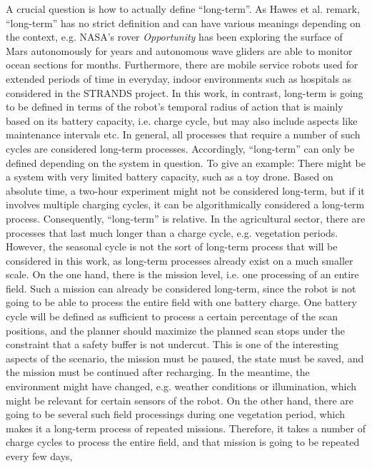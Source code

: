 \documentclass[german, master, expose, latin1]{base/thesis_KBS}
\begin{document}
A crucial question is how to actually define ``long-term''. As Hawes et al. remark, ``long-term'' has no strict definition and can have various meanings depending
on the context, e.g. NASA's rover \textit{Opportunity} has been exploring the surface of Mars autonomously for years and autonomous wave gliders are able to monitor
ocean sections for months. \cite{Hawes:2017} Furthermore, there are mobile service robots used for extended periods of time in everyday, indoor environments such as hospitals 
as considered in the STRANDS project.
In this work, in contrast, long-term is going to be defined in terms of the robot's temporal radius of action that is mainly based on its battery capacity, i.e. charge cycle,
but may also include aspects like maintenance intervals etc. In general, all processes that require a number of such cycles are considered long-term processes.
Accordingly, ``long-term'' can only be defined depending on the system in question. To give an example: There might be a system with very limited battery capacity, 
such as a toy drone. Based on absolute time, a two-hour experiment might not be considered long-term, but if it involves multiple charging cycles, it can be 
algorithmically considered a long-term process. Consequently, ``long-term'' is relative.\newline
In the agricultural sector, there are processes that last much longer than a charge cycle, e.g. vegetation periods.
However, the seasonal cycle is not the sort of long-term process that will be considered in this work, as long-term processes already exist on a much smaller scale.
On the one hand, there is the mission level, i.e. one processing of an entire field. Such a mission can already be considered long-term, since the robot is not 
going to be able to process the entire field with one battery charge. One battery cycle will be defined as sufficient to process a certain percentage of the scan
positions, and the planner should maximize the planned scan stops under the constraint that a safety buffer is not undercut.
This is one of the interesting aspects of the scenario, the mission must be paused, the state must be saved, and the mission must be continued after recharging.
In the meantime, the environment might have changed, e.g. weather conditions or illumination, which might be relevant for certain sensors of the robot. 
On the other hand, there are going to be several such field processings during one vegetation period, which makes it a long-term process of repeated missions.
Therefore, it takes a number of charge cycles to process the entire field, and that mission is going to be repeated every few days,
\end{document}
